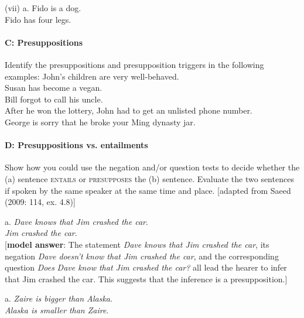 \begin{stylepoints}
(vii)  a. Fido is a dog.\\
\ex Fido has four legs.
\end{stylepoints}

\paragraph*{C: Presuppositions}

Identify the presuppositions and presupposition triggers in the following examples:
\ea
\ea
 John’s children are very well-behaved.\\
\ex Susan has become a vegan.\\
\ex Bill forgot to call his uncle.\\
\ex After he won the lottery, John had to get an unlisted phone number.\\
\ex George is sorry that he broke your Ming dynasty jar.
\z
\z

\paragraph*{D: Presuppositions vs. entailments}

Show how you could use the negation and/or question tests to decide whether the (a) sentence \textsc{entails} or \textsc{presupposes} the (b) sentence. Evaluate the two sentences if spoken by the same speaker at the same time and place. [adapted from Saeed (2009: 114, ex. 4.8)]

\begin{stylepoints}
\ea%
    \label{ex:key:1}

          a. \textit{Dave knows that Jim crashed the car}.\\
\ex \textit{Jim crashed the car}.\\
{}[\textbf{model answer}: The statement \textit{Dave knows that Jim crashed the car}, its negation \textit{Dave doesn’t know that Jim crashed the car}, and the corresponding question \textit{Does} \textit{Dave know that Jim crashed the car?} all lead the hearer to infer that Jim crashed the car. This suggests that the inference is a presupposition.]
\z
\end{stylepoints}

\begin{stylepoints}
\ea%
    \label{ex:key:2}



          a. \textit{Zaire is bigger than Alaska}.\\
\ex \textit{Alaska is smaller than Zaire}.
\z
\end{stylepoints}

